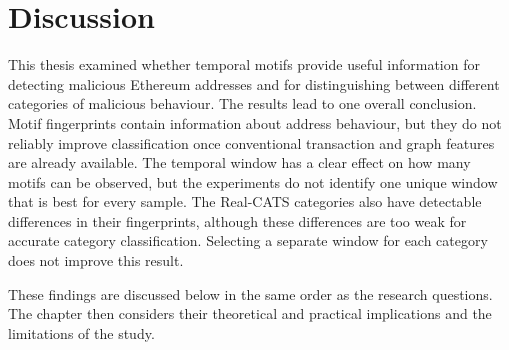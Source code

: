 \chapter{Discussion}
\label{ch:discussion}

This thesis examined whether temporal motifs provide useful information for
detecting malicious Ethereum addresses and for distinguishing between different
categories of malicious behaviour. The results lead to one overall conclusion.
Motif fingerprints contain information about address behaviour,
but they do not reliably improve classification once conventional transaction
and graph features are already available. The temporal window has a clear effect
on how many motifs can be observed, but the experiments do not identify one
unique window that is best for every sample. The Real-CATS categories also have
detectable differences in their fingerprints, although these differences are
too weak for accurate category classification. Selecting a separate window for
each category does not improve this result.

These findings are discussed below in the same order as the research questions.
The chapter then considers their theoretical and practical implications and the
limitations of the study.

